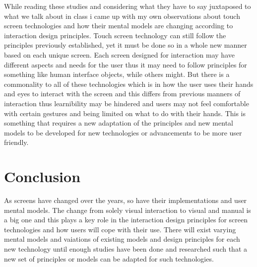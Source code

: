 \documentclass[a4paper]{article}
\begin{document}
     While reading these studies and considering what they have to say juxtaposed to what we talk about in class i came up with my own observations about touch screen technologies and how their mental models are changing according to interaction design principles. Touch screen technology can still follow the principles previously established, yet it must be done so in a whole new manner based on each unique screen. Each screen designed for interaction may have different aspects and needs for the user thus it may need to follow principles for something like human interface objects, while others might. But there is a commonality to all of these technologies which is in how the user uses their hands and eyes to interact with the screen and this differs from previous manners of interaction thus learnibility may be hindered and users may not feel comfortable with certain gestures and being limited on what to do with their hands. This is something that requires a new adaptation of the principles and new mental models to be developed for new technologies or advancements to be more user friendly.
     
\section{Conclusion}

     As screens have changed over the years, so have their implementations and user mental models. The change from solely visual interaction to visual and manual is a big one and this plays a key role in the interaction design principles for screen technologies and how users will cope with their use. There will exist varying mental models and vaiations of existing models and design principles for each new technology until enough studies have been done and researched such that a new set of principles or models can be adapted for such technologies.
     
\end{document}
